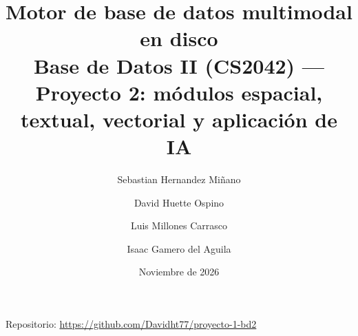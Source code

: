 \documentclass[11pt,a4paper]{article}
\title{Motor de base de datos multimodal en disco\\
\large Base de Datos II (CS2042) --- Proyecto 2: módulos espacial, textual,
vectorial y aplicación de IA}
\author{Sebastian Hernandez Miñano \and David Huette Ospino \and
Luis Millones Carrasco \and Isaac Gamero del Aguila}
\date{Noviembre de 2026}
\begin{document}
\maketitle

\begin{center}
Repositorio: \url{https://github.com/Davidht77/proyecto-1-bd2}
\end{center}

%







\end{document}
